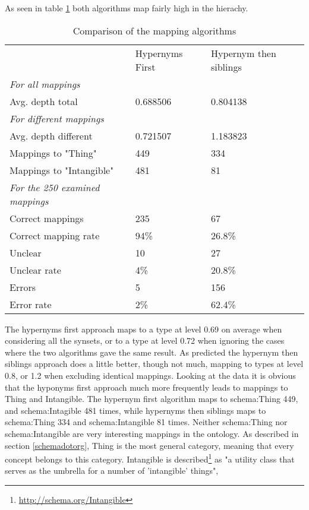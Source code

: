 As seen in table \ref{table:AlgorithmComparison} both algorithms map fairly high in the hierachy.
\begin{table}[ht]
	\centering
	\begin{tabular}{lll}
											& Hypernyms First 	& Hypernym then siblings	\\
		\emph{For all mappings}				&					&							\\
		Avg. depth total					& 0.688506 			& 0.804138					\\
		\emph{For different mappings}		&					&							\\
		Avg. depth different				& 0.721507			& 1.183823					\\
		Mappings to "Thing"					& 449				& 334						\\
		Mappings to "Intangible"			& 481				& 81						\\
		\emph{For the 250 examined mappings}&					&							\\
		Correct mappings					& 235				& 67						\\
		Correct mapping	rate				& 94\%				& 26.8\%					\\
		Unclear								& 10				& 27						\\
		Unclear	rate						& 4\%				& 20.8\%					\\
		Errors								& 5 				& 156 						\\
		Error rate							& 2\%				& 62.4\%					\\
	\end{tabular}
	\caption{Comparison of the mapping algorithms}
	\label{table:AlgorithmComparison}
\end{table}
The hypernyms first approach maps to a type at level 0.69 on average when considering all the synsets,
or to a type at level 0.72 when ignoring the cases where the two algorithms gave the same result.
As predicted the hypernym then siblings approach does a little better, though not much,
mapping to types at level 0.8, or 1.2 when excluding identical mappings.
Looking at the data it is obvious that the hyponyms first approach much more frequently leads to mappings to Thing and Intangible.
The hypernym first algorithm maps to schema:Thing 449, and schema:Intagible 481 times,
while hypernyms then siblings maps to schema:Thing 334 and schema:Intangible 81 times.
Neither schema:Thing nor schema:Intangible are very interesting mappings in the ontology.
As described in section \ref{schemadotorg}, Thing is the most general category, meaning that every concept belongs to this category.
Intangible is described\footnote{\url{http://schema.org/Intangible}} as "a utility class that serves as the umbrella for a number of 'intangible' things",
